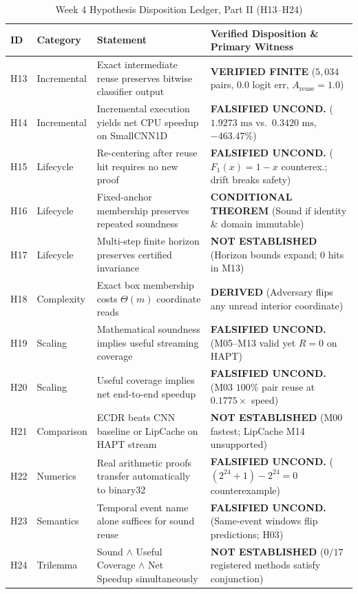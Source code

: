 \documentclass[11pt,oneside,a4paper]{report}
\newcommand{\code}[1]{{\small\upshape\ttfamily #1}}
\theoremstyle{remark}
\begin{document}
\begin{table}[htbp]
\centering\small
\caption{Week 4 Hypothesis Disposition Ledger, Part II (\code{H13}--\code{H24})}
\label{tab:app_h2}
\begin{tabularx}{\textwidth}{@{}P{1.1cm}P{2.5cm}YY@{}}
\toprule
\textbf{ID} & \textbf{Category} & \textbf{Statement} & \textbf{Verified Disposition \& Primary Witness} \\
\midrule
\code{H13} & Incremental & Exact intermediate reuse preserves bitwise classifier output & \textbf{VERIFIED FINITE} ($5,034$ pairs, $0.0$ logit err, $A_{\text{reuse}}=1.0$) \\
\code{H14} & Incremental & Incremental execution yields net CPU speedup on \code{SmallCNN1D} & \textbf{FALSIFIED UNCOND.} ($1.9273\text{ ms}$ vs.\ $0.3420\text{ ms}$, $-463.47\%$) \\
\code{H15} & Lifecycle & Re-centering after reuse hit requires no new proof & \textbf{FALSIFIED UNCOND.} ($F_1(x)=1-x$ counterex.; drift breaks safety) \\
\code{H16} & Lifecycle & Fixed-anchor membership preserves repeated soundness & \textbf{CONDITIONAL THEOREM} (Sound if identity \& domain immutable) \\
\code{H17} & Lifecycle & Multi-step finite horizon preserves certified invariance & \textbf{NOT ESTABLISHED} (Horizon bounds expand; $0$ hits in \code{M13}) \\
\code{H18} & Complexity & Exact box membership costs $\Theta(m)$ coordinate reads & \textbf{DERIVED} (Adversary flips any unread interior coordinate) \\
\code{H19} & Scaling & Mathematical soundness implies useful streaming coverage & \textbf{FALSIFIED UNCOND.} (\code{M05}--\code{M13} valid yet $R=0$ on HAPT) \\
\code{H20} & Scaling & Useful coverage implies net end-to-end speedup & \textbf{FALSIFIED UNCOND.} (\code{M03} $100\%$ pair reuse at $0.1775\times$ speed) \\
\code{H21} & Comparison & ECDR beats CNN baseline or LipCache on HAPT stream & \textbf{NOT ESTABLISHED} (\code{M00} fastest; LipCache \code{M14} unsupported) \\
\code{H22} & Numerics & Real arithmetic proofs transfer automatically to \code{binary32} & \textbf{FALSIFIED UNCOND.} ($(2^{24}+1)-2^{24}=0$ counterexample) \\
\code{H23} & Semantics & Temporal event name alone suffices for sound reuse & \textbf{FALSIFIED UNCOND.} (Same-event windows flip predictions; \code{H03}) \\
\code{H24} & Trilemma & Sound $\land$ Useful Coverage $\land$ Net Speedup simultaneously & \textbf{NOT ESTABLISHED} ($0/17$ registered methods satisfy conjunction) \\
\bottomrule
\end{tabularx}
\end{table}
\end{document}
